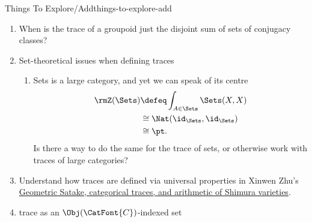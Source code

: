 \begin{remark}{Things To Explore/Add}{things-to-explore-add}
\begin{enumerate}
\begin{enumerate}
                \item Trace of small but non-finite categories:
                    \begin{enumerate}
                        \item $\Sets$
                        \item $\FontForCategories{Rep}(G)$
                        \item category of finite groups
                        \item category of finite abelian groups
                        \item category of finite $p$-groups for fixed $p$
                        \item category of finite $p$-groups for all $p$
                        \item category of finite fields
                        \item category of finite topological spaces
                        \item category of finite [insert a mathematical object here]
                    \end{enumerate}
            \end{enumerate}
        \item When is the trace of a groupoid just the disjoint sum of sets of conjugacy classes?
        \item Set-theoretical issues when defining traces
            \begin{enumerate}
                \item Sets is a large category, and yet we can speak of its centre
                    \begin{align*}
                        \rmZ(\Sets) &\defeq \int_{A\in\Sets}\Sets(X,X)\\%
                                    &\cong  \Nat(\id_{\Sets},\id_{\Sets})\\
                                    &\cong  \pt.
                    \end{align*}
                    Is there a way to do the same for the trace of sets, or otherwise work with traces of large categories?
            \end{enumerate}
        \item Understand how traces are defined via universal properties in Xinwen Zhu's \href{https://arxiv.org/abs/1810.07375}{Geometric Satake, categorical traces, and arithmetic of Shimura varieties}.
        \item trace as an $\Obj(\CatFont{C})$-indexed set

\end{enumerate}
\end{remark}
